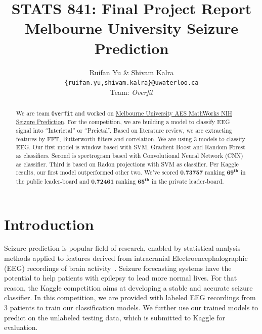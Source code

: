 \documentclass[letterpaper,12pt]{article}
\begin{document}
\title{STATS 841: Final Project Report\\Melbourne University Seizure Prediction}

\author{Ruifan Yu \& Shivam Kalra\\\texttt{\{ruifan.yu,shivam.kalra\}@uwaterloo.ca}\\Team: \textit{Overfit}}

\maketitle

\begin{abstract}

We are team \texttt{Overfit} and worked on
\href{https://www.kaggle.com/c/melbourne-university-seizure-prediction}{Melbourne
University AES MathWorks NIH Seizure Prediction}. For the competition, we are
building a model to classify EEG signal into ``Interictal'' or ``Preictal''.
Based on literature review, we are extracting features by FFT, Butterworth
filters and correlation. We are using 3 models to classify EEG. Our first model
is window based with SVM, Gradient Boost and Random Forest as classifiers.
Second is spectrogram based with Convolutional Neural Network (CNN) as
classifier. Third is based on Radon projections with SVM as classifier. Per Kaggle
results, our first model outperformed other two. We've scored \textbf{0.73757}
ranking $\boldsymbol{69^{th}}$ in the public leader-board and \textbf{0.72461}
ranking $\boldsymbol{65^{th}}$ in the private leader-board.

\end{abstract}


\section{Introduction}

Seizure prediction is popular field of research, enabled by statistical analysis
methods applied to features derived from intracranial Electroencephalographic
(EEG) recordings of brain activity~\cite{mirowski2008comparing}. Seizure
forecasting systems have the potential to help patients with epilepsy to lead
more normal lives. For that reason, the Kaggle competition aims at developing a
stable and accurate seizure classifier. In this competition, we are provided
with labeled EEG recordings from 3 patients to train our classification models.
We further use our trained models to predict on the unlabeled testing data,
which is submitted to Kaggle for evaluation.
\end{document}
